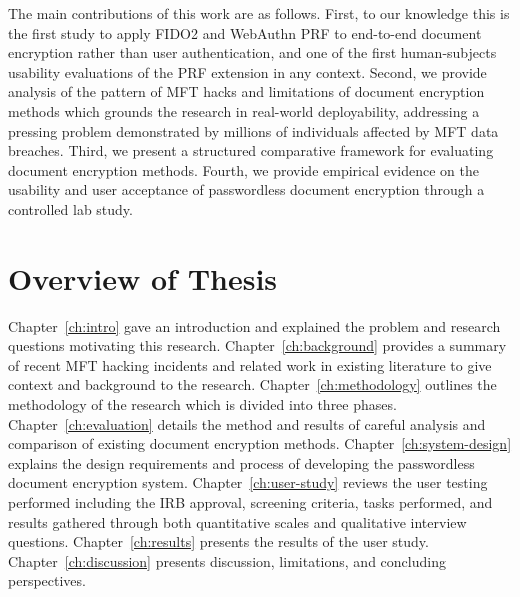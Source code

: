 The main contributions of this work are as follows. First, to our knowledge this is the first study to apply FIDO2 and WebAuthn PRF to end-to-end document encryption rather than user authentication, and one of the first human-subjects usability evaluations of the PRF extension in any context. Second, we provide analysis of the pattern of MFT hacks and limitations of document encryption methods which grounds the research in real-world deployability, addressing a pressing problem demonstrated by millions of individuals affected by MFT data breaches. Third, we present a structured comparative framework for evaluating document encryption methods. Fourth, we provide empirical evidence on the usability and user acceptance of passwordless document encryption through a controlled lab study.

\section{Overview of Thesis}
\label{sec:thesis-overview}

Chapter~\ref{ch:intro} gave an introduction and explained the problem and research questions motivating this research. Chapter~\ref{ch:background} provides a summary of recent MFT hacking incidents and related work in existing literature to give context and background to the research. Chapter~\ref{ch:methodology} outlines the methodology of the research which is divided into three phases. Chapter~\ref{ch:evaluation} details the method and results of careful analysis and comparison of existing document encryption methods. Chapter~\ref{ch:system-design} explains the design requirements and process of developing the passwordless document encryption system. Chapter~\ref{ch:user-study} reviews the user testing performed including the IRB approval, screening criteria, tasks performed, and results gathered through both quantitative scales and qualitative interview questions. Chapter~\ref{ch:results} presents the results of the user study. Chapter~\ref{ch:discussion} presents discussion, limitations, and concluding perspectives.
